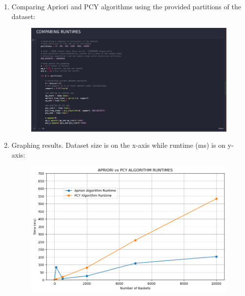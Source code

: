 \documentclass{article}
\begin{document}
\begin{enumerate}[label=\alph*., left=10pt, itemsep=10pt]
        \item \begin{minipage}[t]{0.9\textwidth}
            Comparing Apriori and PCY algorithms using the provided partitions
            of the dataset:
            \begin{figure}[H]
                \centering
                \includegraphics[width=1\textwidth, height=0.4\textheight]{./c.png}
            \end{figure}
        \end{minipage}

        \item \begin{minipage}[t]{0.9\textwidth}
            Graphing results. Dataset size is on the x-axis while runtime (ms) is on y-axis:
            \begin{figure}[H]
                \centering
                \includegraphics[width=1\textwidth, height=0.4\textheight]{./d.png}
            \end{figure}
        \end{minipage}


\end{enumerate}
\end{document}
